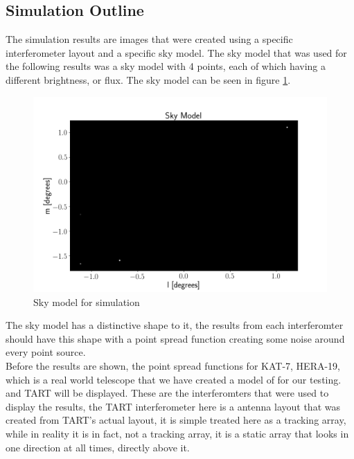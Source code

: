 \subsection{Simulation Outline}
The simulation results are images that were created using a specific interferometer layout and a specific sky model. The sky model that was used for the following results was a sky model with 4 points, each of which having a different brightness, or flux. The sky model can be seen in figure \ref{fig:Sky_model}.
\begin{figure}[H]
    \centering
    \includegraphics[scale=0.4]{images/4_POINT.png}
    \caption{Sky model for simulation}
    \label{fig:Sky_model}
\end{figure}
\begin{center}
\end{center}
The sky model has a distinctive shape to it, the results from each interferomter should have this shape with a point spread function creating some noise around every point source. \\
Before the results are shown, the point spread functions for KAT-7, HERA-19, which is a real world telescope that we have created a model of for our testing.\cite{HERA-19} and TART will be displayed. These are the interferomters that were used to display the results, the TART interferometer here is a antenna layout that was created from TART's actual layout, it is simple treated here as a tracking array, while in reality it is in fact, not a tracking array, it is a static array that looks in one direction at all times, directly above it.
